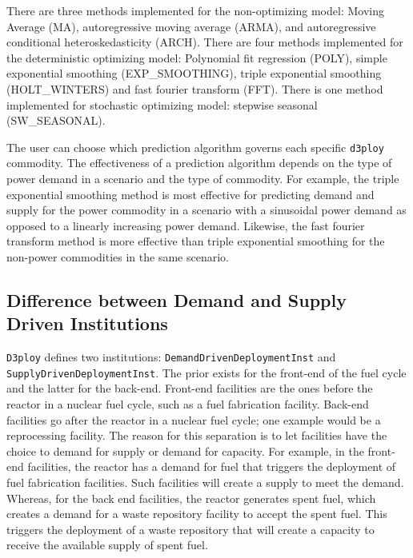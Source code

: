 \documentclass[11pt,letterpaper]{article}
\newcommand{\deploy}{\texttt{d3ploy}\xspace}%
\newcommand{\Deploy}{\texttt{D3ploy}\xspace}%
\begin{document}
There are three methods implemented for the non-optimizing model: 
Moving Average (MA), autoregressive moving average (ARMA), and autoregressive 
conditional heteroskedasticity (ARCH).
There are four methods implemented for the deterministic optimizing model: 
Polynomial fit regression (POLY), simple exponential smoothing (EXP\_SMOOTHING),  
triple exponential smoothing (HOLT\_WINTERS) and fast fourier 
transform (FFT). 
There is one method implemented for stochastic optimizing model: 
stepwise seasonal (SW\_SEASONAL).  

The user can choose which prediction algorithm governs each specific 
\deploy commodity. 
The effectiveness of a prediction algorithm depends on the type 
of power demand in a scenario and the type of commodity. 
For example, the triple exponential smoothing method is most effective
for predicting demand and supply for the power commodity in a scenario  
with a sinusoidal power demand as opposed to a linearly increasing power 
demand.
Likewise, the fast fourier transform method is more effective than triple 
exponential smoothing for the non-power commodities in the same 
scenario.  

\subsection{\textbf{Difference between Demand and Supply Driven Institutions}}
\Deploy defines two institutions: \texttt{DemandDrivenDeploymentInst} and \texttt{SupplyDrivenDeploymentInst}. 
The prior exists for the front-end of the fuel cycle and the latter
for the back-end. 
Front-end facilities are the ones before the reactor 
in a nuclear fuel cycle, such as a fuel fabrication facility. 
Back-end facilities go after the reactor in a nuclear 
fuel cycle; one example would be a reprocessing facility. 
The reason for this separation is to let facilities have the choice 
to demand for supply or demand for capacity. 
For example, in the front-end facilities, the reactor has a demand for 
fuel that triggers the deployment of fuel fabrication facilities. Such facilities
will create a supply to meet the demand.
Whereas, for the back end facilities, the reactor generates spent fuel, 
which creates a demand for a waste repository facility to accept the 
spent fuel. This triggers the deployment of a waste repository that
will create a capacity to receive the available supply of spent fuel.
\end{document}
